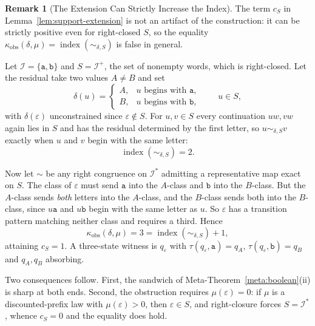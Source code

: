\documentclass[12pt]{article}
\theoremstyle{definition}
\newtheorem{remark}[theorem]{Remark}
\begin{document}
\begin{remark}[The Extension Can Strictly Increase the Index]
\label{rem:support-extension-sharp}
The term $c_S$ in Lemma~\ref{lem:support-extension} is not an artifact of the
construction: it can be strictly positive even for right-closed $S$, so the
equality $\kappa_{\mathrm{obs}}(\delta,\mu)=\operatorname{index}(\sim_{\delta,S})$
is false in general.

Let $\mathcal I=\{\mathtt a,\mathtt b\}$ and $S=\mathcal I^{+}$, the set of
nonempty words, which is right-closed.  Let the residual take two values
$A\ne B$ and set
\[
\delta(u)=
\begin{cases}
A, & u\text{ begins with }\mathtt a,\\
B, & u\text{ begins with }\mathtt b,
\end{cases}
\qquad u\in S,
\]
with $\delta(\varepsilon)$ unconstrained since $\varepsilon\notin S$.  For
$u,v\in S$ every continuation $uw,vw$ again lies in $S$ and has the residual
determined by the first letter, so $u\sim_{\delta,S}v$ exactly when $u$ and $v$
begin with the same letter:
\[
\operatorname{index}(\sim_{\delta,S})=2 .
\]

Now let $\sim$ be any right congruence on $\mathcal I^*$ admitting a
representative map exact on $S$.  The class of $\varepsilon$ must send
$\mathtt a$ into the $A$-class and $\mathtt b$ into the $B$-class.  But the
$A$-class sends \emph{both} letters into the $A$-class, and the $B$-class sends
both into the $B$-class, since $u\mathtt a$ and $u\mathtt b$ begin with the same
letter as $u$.  So $\varepsilon$ has a transition pattern matching neither
class and requires a third.  Hence
\[
\kappa_{\mathrm{obs}}(\delta,\mu)=3=\operatorname{index}(\sim_{\delta,S})+1 ,
\]
attaining $c_S=1$.  A three-state witness is $q_\varepsilon$ with
$\tau(q_\varepsilon,\mathtt a)=q_A$, $\tau(q_\varepsilon,\mathtt b)=q_B$ and
$q_A,q_B$ absorbing.

Two consequences follow.  First, the sandwich of
Meta-Theorem~\ref{meta:boolean}(ii) is sharp at both ends.  Second, the
obstruction requires $\mu(\varepsilon)=0$: if $\mu$ is a discounted-prefix law
with $\mu(\varepsilon)>0$, then $\varepsilon\in S$, and right-closure forces
$S=\mathcal I^*$, whence $c_S=0$ and the equality does hold.
\end{remark}
\end{document}
